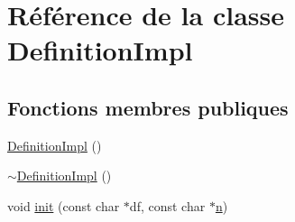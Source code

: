 \hypertarget{class_definition_impl}{}\section{Référence de la classe Definition\+Impl}
\label{class_definition_impl}
\subsection*{Fonctions membres publiques}
\begin{DoxyCompactItemize}
\item 
\hyperlink{class_definition_impl_ad20015f809e04f727178f024f66e9c9f}{Definition\+Impl} ()
\item 
\hyperlink{class_definition_impl_aa7e7868bd00eb4970333fc6da39aae39}{$\sim$\+Definition\+Impl} ()
\item 
void \hyperlink{class_definition_impl_a85ef125ece3adbf81088aed11b23a695}{init} (const char $\ast$df, const char $\ast$\hyperlink{060__command__switch_8tcl_acdde3cd86eb2421ce8dbb2e85227d368}{n})
\end{DoxyCompactItemize}
